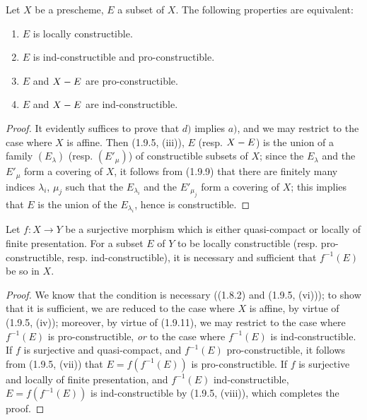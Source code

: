\begin{proposition}[1.9.11]
\label{IV.1.9.11}
Let $X$ be a prescheme, $E$ a subset of $X$. The following properties are
equivalent:
\begin{enumerate}
  \item[a)] $E$ is locally constructible.
  \item[b)] $E$ is ind-constructible and pro-constructible.
  \item[c)] $E$ and $X- E$ are pro-constructible.
  \item[d)] $E$ and $X- E$ are ind-constructible.
\end{enumerate}
\end{proposition}

\begin{proof}
It evidently suffices to prove that $d)$ implies $a)$, and we may restrict
to the case where $X$ is affine. Then (1.9.5, (iii)), $E$ (resp. $X- E$) is
the union of a family $(E_\lambda)$ (resp. $(E'_\mu)$) of constructible
subsets of $X$; since the $E_\lambda$ and the $E'_\mu$ form a covering of
$X$, it follows from (1.9.9) that there are finitely many indices
$\lambda_i$, $\mu_j$ such that the $E_{\lambda_i}$ and the $E'_{\mu_j}$ form
a covering of $X$; this implies that $E$ is the union of the
$E_{\lambda_i}$, hence is constructible.
\end{proof}

\begin{corollary}[1.9.12]
\label{IV.1.9.12}
Let $f:X\to Y$ be a surjective morphism which is either quasi-compact or
locally of finite presentation. For a subset $E$ of $Y$ to be
locally constructible \textup{(resp.} pro-constructible, \textup{resp.} ind-constructible\textup{)},
it is necessary and sufficient that $f^{-1}(E)$ be so in $X$.
\end{corollary}


\begin{proof}
We know that the condition is necessary ((1.8.2) and (1.9.5, (vi))); to
show that it is sufficient, we are reduced to the case where $X$ is affine,
by virtue of (1.9.5, (iv)); moreover, by virtue of (1.9.11), we may restrict
to the case where $f^{-1}(E)$ is pro-constructible, \emph{or} to the case
where $f^{-1}(E)$ is ind-constructible. If $f$ is surjective and
quasi-compact, and $f^{-1}(E)$ pro-constructible, it follows from (1.9.5,
(vii)) that $E=f(f^{-1}(E))$ is pro-constructible. If $f$ is surjective and
locally of finite presentation, and $f^{-1}(E)$ ind-constructible,
$E=f(f^{-1}(E))$ is ind-constructible by (1.9.5, (viii)), which completes the
proof.
\end{proof}

